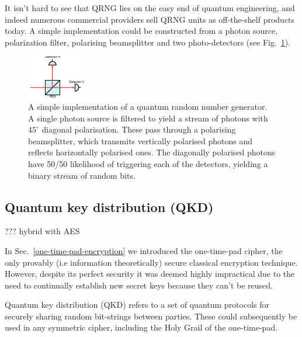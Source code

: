 It isn't hard to see that QRNG lies on the easy end of quantum engineering, and indeed numerous commercial providers sell QRNG units as off-the-shelf products today. A simple implementation could be constructed from a photon source, polarization filter, polarising beamsplitter and two photo-detectors (see Fig.~\ref{fig:QRNG}).

\begin{figure}[!htb]
	\centering
	\includegraphics[width=0.7\columnwidth]{figures/QRNG.pdf}
	\caption{A simple implementation of a quantum random number generator. A single photon source is filtered to yield a stream of photons with $45^\circ$ diagonal polarisation. These pass through a polarising beamsplitter, which transmits vertically polarised photons and reflects horizontally polarised ones. The diagonally polarised photons have 50/50 likelihood of triggering each of the detectors, yielding a binary stream of random bits.} \label{fig:QRNG}
\end{figure}

\subsection{Quantum key distribution (QKD)} \label{quantum-key-distribution-qkd}

??? hybrid with AES

In Sec.~\ref{one-time-pad-encryption} we introduced the one-time-pad cipher, the only provably (i.e information theoretically) secure classical encryption technique. However, despite its perfect security it was deemed highly impractical due to the need to continually establish new secret keys because they can't be reused.

Quantum key distribution (QKD) refers to a set of quantum protocols for securely sharing random bit-strings between parties. These could subsequently be used in any symmetric cipher, including the Holy Grail of the one-time-pad.

